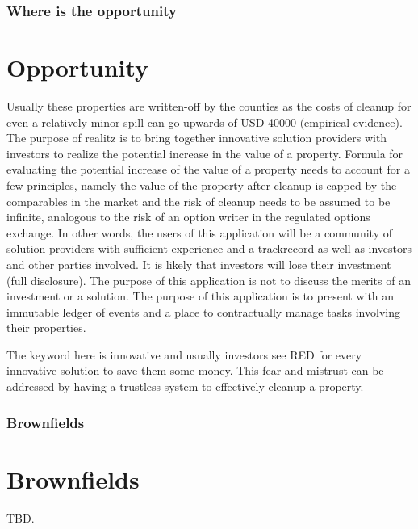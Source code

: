 \documentclass{beamer}
\begin{document}
\begin{frame}
\frametitle{Where is the opportunity}
\section {Opportunity}
Usually these properties are written-off by the counties as the costs of cleanup for even a relatively minor spill can go upwards of USD 40000 (empirical evidence). The purpose of realitz is to bring together innovative solution providers with investors to realize the potential increase in the value of a property. Formula for evaluating the potential increase of the value of a property needs to account for a few principles, namely the value of the property after cleanup is capped by the comparables in the market and the risk of cleanup needs to be assumed to be infinite, analogous to the risk of an option writer in the regulated options exchange. In other words, the users of this application will be a community of solution providers with sufficient experience and a trackrecord as well as investors and other parties involved. It is likely that investors will lose their investment (full disclosure). The purpose of this application is not to discuss the merits of an investment or a solution. The purpose of this application is to present with an immutable ledger of events and a place to contractually manage tasks involving their properties.

The keyword here is innovative and usually investors see RED for every innovative solution to save them some money. This fear and mistrust can be addressed by having a trustless system to effectively cleanup a property.
\end{frame}
\begin{frame}
\frametitle{Brownfields}
\section{Brownfields} \label{brownfields}
  TBD.
\end{frame}
\end{document}
